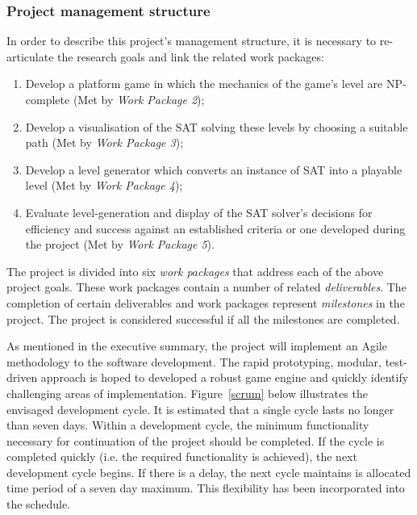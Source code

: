 \documentclass[a4paper]{article}
\begin{document}
\subsubsection{Project management structure}

In order to describe this project's management structure, it is necessary to re-articulate the
research goals and link the related work packages:

\begin{enumerate}

  \item Develop a platform game in which the mechanics of the game's level are NP-complete (Met by \textit{Work Package 2});
  \item Develop a visualisation of the SAT solving these levels by choosing a suitable path (Met by \textit{Work Package 3});
  \item Develop a level generator which converts an instance of SAT into a playable level (Met by \textit{Work Package 4});
  \item Evaluate level-generation and display of the SAT solver's decisions for efficiency and success against an
        established criteria or one developed during the project (Met by \textit{Work Package 5}).

\end{enumerate}

The project is divided into six \textit{work packages} that address each of the above project
goals. These work packages contain a number of related \textit{deliverables}. The completion of
certain deliverables and work packages represent \textit{milestones} in the project. The project is
considered successful if all the milestones are completed.

As mentioned in the executive summary, the project will implement an Agile methodology to the
software development. The rapid prototyping, modular, test-driven approach is hoped to developed a
robust game engine and quickly identify challenging areas of implementation. Figure~\ref{scrum}
below illustrates the envisaged development cycle. It is estimated that a single cycle
lasts no longer than seven days. Within a development cycle, the minimum functionality necessary for
continuation of the project should be completed. If the cycle is completed quickly (i.e. the
required functionality is achieved), the next development cycle begins. If there is a delay, the
next cycle maintains is allocated time period of a seven day maximum. This flexibility has been
incorporated into the schedule.
\end{document}
